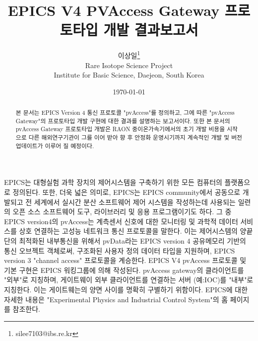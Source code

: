 \documentclass[11pt
  , a4paper
  , article
  , oneside
]{memoir}
\begin{document}
\newcommand{\technumber}{
  RAON Control-Document Series\\
  Revision : v1.0,   Release : 2016-12-02 fixed date}
\title{\textbf{EPICS V4 PVAccess Gateway 프로토타입 개발 결과보고서}}

\author{이상일\thanks{silee7103@ibs.re.kr} \\

  Rare Isotope Science Project\\
  Institute for Basic Science, Daejeon, South Korea
}
\date{\today}

\renewcommand{\maketitlehooka}{\begin{flushright}\textsf{\technumber}\end{flushright}}

\maketitle

\begin{abstract}
본 문서는 EPICS Version 4 통신 프로토콜 "pvAccess"를 정의하고, 그에 따른 "pvAccess Gateway"의 프로토타입 개발 구현에 대한 결과를 설명하는 보고서이다. 또한 본 문서의 pvAccess Gateway 프로토타입 개발은 RAON 중이온가속기에서의 초기 개발 비용을 시작으로 다른 해외연구기관이 그를 이어 받아 향 후 안정화 운영시기까지 계속적인 개발 및 버전 업데이트가 이루어 질 예정이다. 
\end{abstract}

EPICS\citep{epics}는 대형실험 과학 장치의 제어시스템을 구축하기 위한 모든 컴퓨터의 플랫폼으로 정의된다. 또한, 더욱 넓은 의미로, EPICS는 EPICS community에서 공동으로 개발되고 전 세계에서 실시간 분산 소프트웨어 제어 시스템을 작성하는데 사용되는 일련의 오픈 소스 소프트웨어 도구, 라이브러리 및 응용 프로그램이기도 하다. 그 중 EPICS version4\citep{epics_v4}의 pvAccess\citep{epics_v4_pvaccess}는 계측센서 신호에 대한 모니터링 및 과학적 데이터 서비스를 상호 연결하는 고성능 네트워크 통신 프로토콜을 말한다. 이는 제어시스템의 양끝단의 최적화된 내부통신을 위해서 pvData라는 EPICS version 4 공유메모리 기반의 통신 오브젝트 객체로써, 구조화된 사용자 정의 데이터 타입을 지원하며, EPICS version 3 "channel access" 프로토콜을 계승한다. EPICS V4 pvAccess 프로토콜 및 기본 구현은 EPICS 워킹그룹에 의해 작성된다. pvAccess gateway의 클라이언트를 "외부"로 지칭하며, 게이트웨이 외부 클라이언트를  연결하는 서버 (예:IOC)를 "내부"로 지칭한다. 이는 게이트웨는의 양면 사이를 명확히 구별하기 위함이다. EPICS에 대한 자세한 내용은 "Experimental Physics and Industrial Control System"\citep{epics}의 홈 페이지를 참조한다. 
\end{document}
